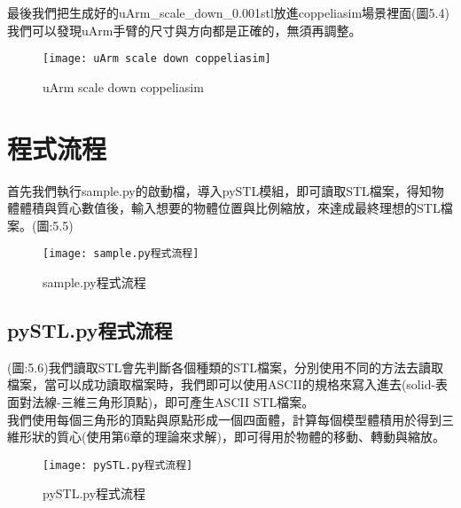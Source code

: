 最後我們把生成好的uArm\_scale\_down\_0.001stl放進coppeliasim場景裡面(圖5.4)我們可以發現uArm手臂的尺寸與方向都是正確的，無須再調整。\\

\begin{figure}[hbt!]
\begin{center}
\texttt{[image: uArm scale down coppeliasim]}
\caption{\Large uArm scale down coppeliasim}\label{uArm scale down coppeliasim}
\end{center}
\end{figure}

\section{程式流程}

首先我們執行sample.py的啟動檔，導入pySTL模組，即可讀取STL檔案，得知物體體積與質心數值後，輸入想要的物體位置與比例縮放，來達成最終理想的STL檔案。(圖:5.5)\\

\begin{figure}[hbt!]
\begin{center}
\texttt{[image: sample.py程式流程]}
\caption{\Large sample.py程式流程}\label{sample.py程式流程}
\end{center}
\end{figure}

\subsection{pySTL.py程式流程} 
(圖:5.6)我們讀取STL會先判斷各個種類的STL檔案，分別使用不同的方法去讀取檔案，當可以成功讀取檔案時，我們即可以使用ASCII的規格來寫入進去(solid-表面對法線-三維三角形頂點)，即可產生ASCII STL檔案。\\

    我們使用每個三角形的頂點與原點形成一個四面體，計算每個模型體積用於得到三維形狀的質心(使用第6章的理論來求解)，即可得用於物體的移動、轉動與縮放。\\

\begin{figure}[hbt!]
\begin{center}
\texttt{[image: pySTL.py程式流程]}
\caption{\Large pySTL.py程式流程}\label{pySTL.py程式流程}
\end{center}
\end{figure}


